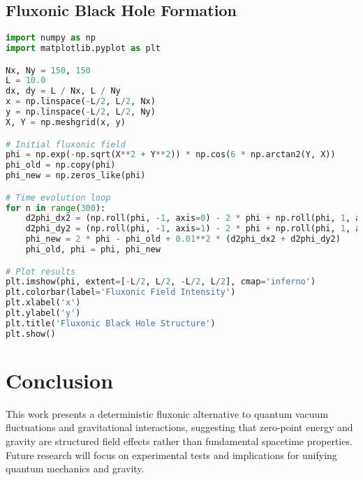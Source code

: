 \documentclass{article}
\begin{document}
\subsection{Fluxonic Black Hole Formation}
\begin{lstlisting}[language=Python]
import numpy as np
import matplotlib.pyplot as plt

Nx, Ny = 150, 150
L = 10.0
dx, dy = L / Nx, L / Ny
x = np.linspace(-L/2, L/2, Nx)
y = np.linspace(-L/2, L/2, Ny)
X, Y = np.meshgrid(x, y)

# Initial fluxonic field
phi = np.exp(-np.sqrt(X**2 + Y**2)) * np.cos(6 * np.arctan2(Y, X))
phi_old = np.copy(phi)
phi_new = np.zeros_like(phi)

# Time evolution loop
for n in range(300):
    d2phi_dx2 = (np.roll(phi, -1, axis=0) - 2 * phi + np.roll(phi, 1, axis=0)) / dx**2
    d2phi_dy2 = (np.roll(phi, -1, axis=1) - 2 * phi + np.roll(phi, 1, axis=1)) / dy**2
    phi_new = 2 * phi - phi_old + 0.01**2 * (d2phi_dx2 + d2phi_dy2)
    phi_old, phi = phi, phi_new

# Plot results
plt.imshow(phi, extent=[-L/2, L/2, -L/2, L/2], cmap='inferno')
plt.colorbar(label='Fluxonic Field Intensity')
plt.xlabel('x')
plt.ylabel('y')
plt.title('Fluxonic Black Hole Structure')
plt.show()
\end{lstlisting}

\section{Conclusion}
This work presents a deterministic fluxonic alternative to quantum vacuum fluctuations and gravitational interactions, suggesting that zero-point energy and gravity are structured field effects rather than fundamental spacetime properties. Future research will focus on experimental tests and implications for unifying quantum mechanics and gravity.
\end{document}
